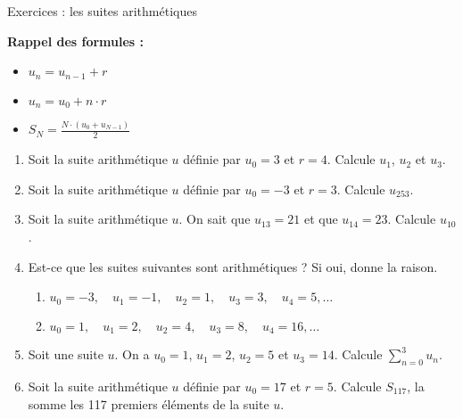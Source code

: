 



	\vspace{3em}
	\begin{center}
			{\Large Exercices : les suites arithmétiques}
	\end{center}
	
	\vspace{3em}
	
	\textbf{Rappel des formules :}
	\begin{itemize}
		\item $u_n = u_{n-1} + r$
		\item $u_n = u_0 + n \cdot r$
		\item $S_N = \frac{N \cdot (u_0 + u_{N-1})}{2}$
	\end{itemize}
	
	\vspace{3em}
	
	\begin{enumerate}
		\item 
			Soit la suite arithmétique $u$ définie par $u_0 = 3$ et $r=4$. Calcule $u_1$, $u_2$ et $u_3$.
			\vspace{3em}
			
		\item 
			Soit la suite arithmétique $u$ définie par $u_0 = -3$ et $r=3$. Calcule $u_{253}$.
			\vspace{3em}
			
		\item 
			Soit la suite arithmétique $u$. On sait que $u_{13} = 21$ et que $u_{14} = 23$. Calcule $u_{10}$.
			\vspace{3em}
			
		\item 
			Est-ce que les suites suivantes sont arithmétiques ? Si oui, donne la raison.
			\begin{enumerate}
				\item $u_0 = -3, \quad u_1 = -1, \quad u_2 = 1, \quad u_3 = 3, \quad u_4 = 5,\dots$
				\item $u_0 = 1, \quad u_1 = 2, \quad u_2 = 4, \quad u_3 = 8, \quad u_4 = 16,\dots$
			\end{enumerate}
			\vspace{3em}
			
		\item 
			Soit une suite $u$. On a $u_0 = 1$, $u_1=2$, $u_2 = 5$ et $u_3 = 14$. Calcule $\sum_{n=0}^{3} u_n$.
			\vspace{3em}
			
		\item 
			Soit la suite arithmétique $u$ définie par $u_0 = 17$ et $r = 5$. Calcule $S_{117}$, la somme les 117 premiers éléments de la suite $u$.
	\end{enumerate}
	
